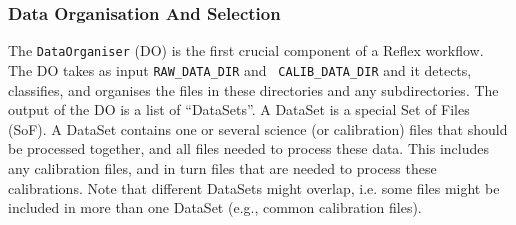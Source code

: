 \subsubsection{Data Organisation And
  Selection}\label{sec:data_organizer}


The {\tt DataOrganiser} (DO) is the first crucial component of a
Reflex workflow. The DO takes as input {\tt RAW\_DATA\_DIR} and {\tt
  CALIB\_DATA\_DIR} and it detects, classifies, and organises the
files in these directories and any subdirectories. The output of the
DO is a list of ``DataSets''. A DataSet is a special Set of Files
(SoF). A DataSet contains one or several science (or calibration)
files that should be processed together, and all files needed to
process these data. This includes any calibration files, and in turn
files that are needed to process these calibrations. Note that
different DataSets might overlap, i.e.  some files might be included
in more than one DataSet (e.g., common calibration files).

